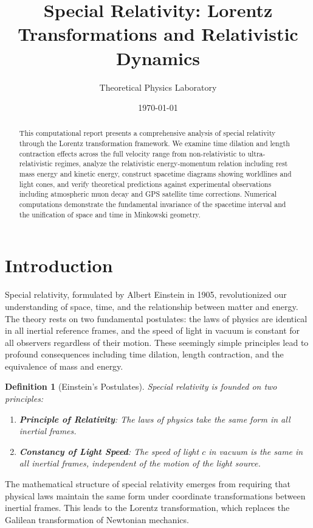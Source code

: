 \documentclass[a4paper, 11pt]{article}
\title{Special Relativity: Lorentz Transformations and Relativistic Dynamics}
\author{Theoretical Physics Laboratory}
\date{\today}
\newtheorem{definition}{Definition}[section]
\begin{document}
\maketitle

\begin{abstract}
This computational report presents a comprehensive analysis of special relativity through
the Lorentz transformation framework. We examine time dilation and length contraction effects
across the full velocity range from non-relativistic to ultra-relativistic regimes, analyze
the relativistic energy-momentum relation including rest mass energy and kinetic energy,
construct spacetime diagrams showing worldlines and light cones, and verify theoretical
predictions against experimental observations including atmospheric muon decay and GPS
satellite time corrections. Numerical computations demonstrate the fundamental invariance
of the spacetime interval and the unification of space and time in Minkowski geometry.
\end{abstract}

\section{Introduction}

Special relativity, formulated by Albert Einstein in 1905, revolutionized our understanding
of space, time, and the relationship between matter and energy. The theory rests on two
fundamental postulates: the laws of physics are identical in all inertial reference frames,
and the speed of light in vacuum is constant for all observers regardless of their motion.
These seemingly simple principles lead to profound consequences including time dilation,
length contraction, and the equivalence of mass and energy.

\begin{definition}[Einstein's Postulates]
Special relativity is founded on two principles:
\begin{enumerate}
\item \textbf{Principle of Relativity}: The laws of physics take the same form in all inertial frames.
\item \textbf{Constancy of Light Speed}: The speed of light $c$ in vacuum is the same in all inertial frames, independent of the motion of the light source.
\end{enumerate}
\end{definition}

The mathematical structure of special relativity emerges from requiring that physical laws
maintain the same form under coordinate transformations between inertial frames. This leads
to the Lorentz transformation, which replaces the Galilean transformation of Newtonian mechanics.
\end{document}
